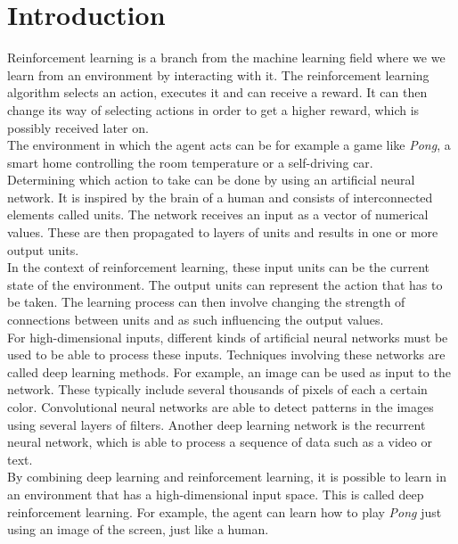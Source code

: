 \chapter{Introduction}

Reinforcement learning is a branch from the machine learning field where we we learn from an environment by interacting with it.
The reinforcement learning algorithm selects an action, executes it and can receive a reward.
It can then change its way of selecting actions in order to get a higher reward, which is possibly received later on.\\
The environment in which the agent acts can be for example a game like \textit{Pong}, a smart home controlling the room temperature or a self-driving car.\\

Determining which action to take can be done by using an artificial neural network.
It is inspired by the brain of a human and consists of interconnected elements called units.
The network receives an input as a vector of numerical values.
These are then propagated to layers of units and results in one or more output units.\\
In the context of reinforcement learning, these input units can be the current state of the environment.
The output units can represent the action that has to be taken.
The learning process can then involve changing the strength of connections between units and as such influencing the output values.\\

For high-dimensional inputs, different kinds of artificial neural networks must be used to be able to process these inputs. Techniques involving these networks are called deep learning methods.
For example, an image can be used as input to the network.
These typically include several thousands of pixels of each a certain color.
Convolutional neural networks are able to detect patterns in the images using several layers of filters.
Another deep learning network is the recurrent neural network, which is able to process a sequence of data such as a video or text.\\

By combining deep learning and reinforcement learning, it is possible to learn in an environment that has a high-dimensional input space. This is called deep reinforcement learning.
For example, the agent can learn how to play \textit{Pong} just using an image of the screen, just like a human.\\

